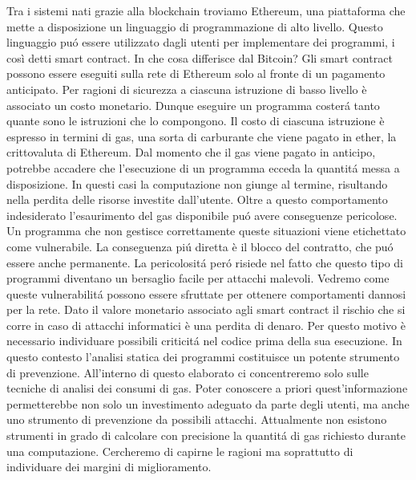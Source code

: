 Tra i sistemi nati grazie alla blockchain troviamo Ethereum, una piattaforma che mette a disposizione un linguaggio di programmazione di alto livello. Questo linguaggio puó essere utilizzato dagli utenti per implementare dei programmi, i così detti smart contract.\newline
In che cosa differisce dal Bitcoin?\newline
\newline
Gli smart contract possono essere eseguiti sulla rete di Ethereum solo al fronte di un pagamento anticipato. Per ragioni di sicurezza a ciascuna istruzione di basso livello è associato un costo monetario. Dunque eseguire un programma costerá tanto quante sono le istruzioni che lo compongono.
Il costo di ciascuna istruzione è espresso in termini di gas, una sorta di carburante che viene pagato in ether, la crittovaluta di Ethereum.
Dal momento che il gas viene pagato in anticipo, potrebbe accadere che l'esecuzione di un programma ecceda la quantitá messa a disposizione. In questi casi la computazione non giunge al termine, risultando nella perdita delle risorse investite dall'utente. Oltre a questo comportamento indesiderato l'esaurimento del gas disponibile puó avere conseguenze pericolose.
Un programma che non gestisce correttamente queste situazioni viene etichettato come vulnerabile. La conseguenza piú diretta è il blocco del contratto, che puó essere anche permanente. La pericolositá peró risiede nel fatto che questo tipo di programmi diventano un bersaglio facile per attacchi malevoli. Vedremo come queste vulnerabilitá possono essere sfruttate per ottenere
comportamenti dannosi per la rete.\newline
Dato il valore monetario associato agli smart contract il rischio che si corre in caso di attacchi informatici è una perdita di denaro. Per questo motivo è necessario individuare possibili criticitá nel codice prima della sua esecuzione. In questo contesto l'analisi statica dei programmi costituisce un potente
strumento di prevenzione.\newline
\newline
All'interno di questo elaborato ci concentreremo solo sulle tecniche di analisi dei consumi di gas. Poter conoscere a priori quest'informazione permetterebbe non solo un investimento adeguato da parte degli utenti, ma anche uno strumento di prevenzione da possibili attacchi.\newline
Attualmente non esistono strumenti in grado di calcolare con precisione la quantitá di gas richiesto durante una computazione. Cercheremo di capirne le ragioni ma soprattutto di individuare dei margini di miglioramento.\newline
\newline

